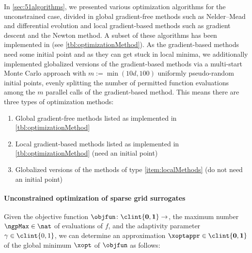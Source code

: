 In \cref{sec:51algorithms}, we presented various optimization algorithms
for the unconstrained case,
divided in global gradient-free methods such as Nelder--Mead and
differential evolution and local gradient-based methods such as
gradient descent and the Newton method.
A subset of these algorithms has been implemented in \sgpp
(see \cref{tbl:optimizationMethod}).
As the gradient-based methods need some initial point and
as they can get stuck in local minima,
we additionally implemented globalized versions of the gradient-based methods
via a multi-start Monte Carlo approach with $m := \min(10d, 100)$
uniformly pseudo-random initial points, evenly splitting the number of
permitted function evaluations among the $m$ parallel calls of the
gradient-based method.
This means there are three types of optimization methods:

\begin{enumerate}[label={(T\arabic*)},leftmargin=*]
  \item
  \label{item:globalMethods}
  Global gradient-free methods listed as implemented in
  \cref{tbl:optimizationMethod}
  
  \item
  \label{item:localMethods}
  Local gradient-based methods listed as implemented in
  \cref{tbl:optimizationMethod} (need an initial point)
  
  \item
  \label{item:globalizedMethods}
  Globalized versions of the methods of type \ref{item:localMethods}
  (do not need an initial point)
\end{enumerate}

\paragraph{Unconstrained optimization of sparse grid surrogates}

Given the objective function $\objfun\colon \clint{\*0, \*1} \to \real$,
the maximum number $\ngpMax \in \nat$ of evaluations of $f$, and
the adaptivity parameter $\gamma \in \clint{0, 1}$,
we can determine an approximation $\xoptappr \in \clint{\*0, \*1}$
of the global minimum $\xopt$ of $\objfun$ as follows:

